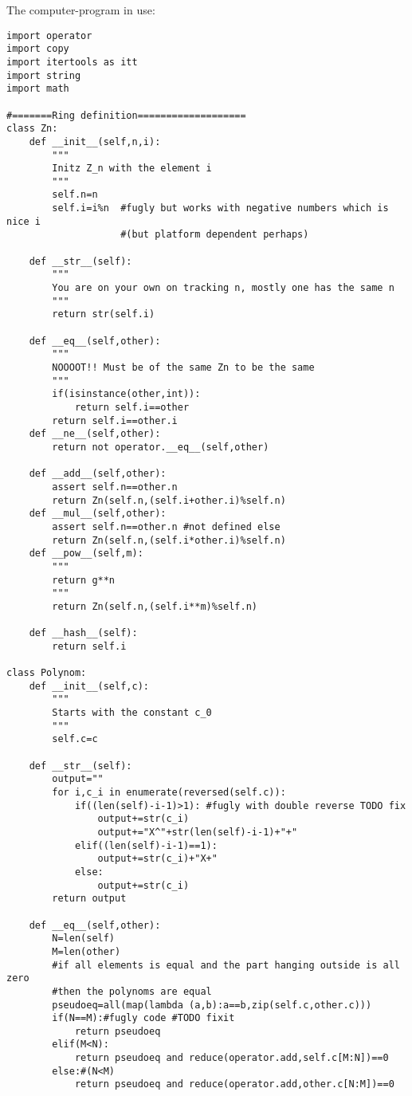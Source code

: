 \documentclass[a4paper,twoside=false,abstract=false,numbers=noenddot,
titlepage=false,headings=small,parskip=half,version=last]{scrartcl}
\theoremstyle{definition}
\theoremstyle{remark}
\begin{document}
\newpage
The computer-program in use:\\
\begin{verbatim}
import operator
import copy
import itertools as itt
import string
import math

#=======Ring definition===================
class Zn:
    def __init__(self,n,i):
        """
        Initz Z_n with the element i
        """
        self.n=n
        self.i=i%n  #fugly but works with negative numbers which is nice i
                    #(but platform dependent perhaps)

    def __str__(self):
        """
        You are on your own on tracking n, mostly one has the same n
        """
        return str(self.i)

    def __eq__(self,other):
        """
        NOOOOT!! Must be of the same Zn to be the same
        """
        if(isinstance(other,int)):
            return self.i==other
        return self.i==other.i
    def __ne__(self,other):
        return not operator.__eq__(self,other)
    
    def __add__(self,other):
        assert self.n==other.n
        return Zn(self.n,(self.i+other.i)%self.n)
    def __mul__(self,other):
        assert self.n==other.n #not defined else
        return Zn(self.n,(self.i*other.i)%self.n)
    def __pow__(self,m):
        """
        return g**n
        """
        return Zn(self.n,(self.i**m)%self.n)
    
    def __hash__(self):
        return self.i

class Polynom:
    def __init__(self,c):
        """
        Starts with the constant c_0
        """
        self.c=c

    def __str__(self):
        output=""
        for i,c_i in enumerate(reversed(self.c)):
            if((len(self)-i-1)>1): #fugly with double reverse TODO fix
                output+=str(c_i)
                output+="X^"+str(len(self)-i-1)+"+"
            elif((len(self)-i-1)==1):
                output+=str(c_i)+"X+"
            else:
                output+=str(c_i)
        return output

    def __eq__(self,other):
        N=len(self)
        M=len(other)
        #if all elements is equal and the part hanging outside is all zero
        #then the polynoms are equal
        pseudoeq=all(map(lambda (a,b):a==b,zip(self.c,other.c)))
        if(N==M):#fugly code #TODO fixit 
            return pseudoeq 
        elif(M<N):
            return pseudoeq and reduce(operator.add,self.c[M:N])==0
        else:#(N<M)
            return pseudoeq and reduce(operator.add,other.c[N:M])==0


\end{verbatim}
\end{document}
